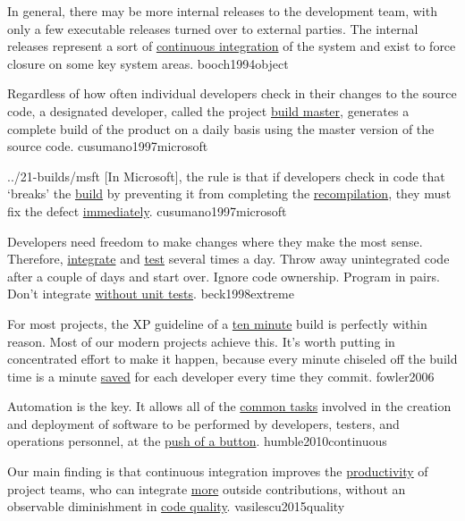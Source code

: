 \documentclass{article}
\begin{document}

  {In general, there may be more internal releases to the development team, with only a few executable releases turned over to external parties. The internal releases represent a sort of \ul{continuous integration} of the system and exist to force closure on some key system areas.}
  {booch1994object}

  {Regardless of how often individual developers check in their changes to the source code, a designated developer, called the project \ul{build master}, generates a complete build of the product on a daily basis using the master version of the source code.}
  {cusumano1997microsoft}

\lnQuote
  {../21-builds/msft}
  {[In Microsoft], the rule is that if developers check in code that `breaks' the \ul{build} by preventing it from completing the \ul{recompilation}, they must fix the defect \ul{immediately}.}
  {cusumano1997microsoft}

  {Developers need freedom to make changes where they make the most sense. Therefore, \ul{integrate} and \ul{test} several times a day. Throw away unintegrated code after a couple of days and start over. Ignore code ownership. Program in pairs. Don't integrate \ul{without unit tests}.}
  {beck1998extreme}

  {For most projects, the XP guideline of a \ul{ten minute} build is perfectly within reason. Most of our modern projects achieve this. It's worth putting in concentrated effort to make it happen, because every minute chiseled off the build time is a minute \ul{saved} for each developer every time they commit.}
  {fowler2006}

  {Automation is the key. It allows all of the \ul{common tasks} involved in the creation and deployment of software to be performed by developers, testers, and operations personnel, at the \ul{push of a button}.}
  {humble2010continuous}

  {Our main finding is that continuous integration improves the \ul{productivity} of project teams, who can integrate \ul{more} outside contributions, without an observable diminishment in \ul{code quality}.}
  {vasilescu2015quality}
\end{document}
